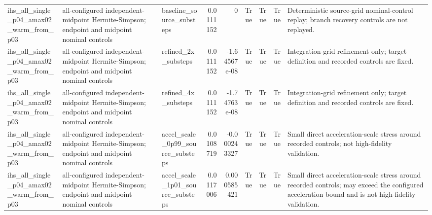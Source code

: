 \begin{tabular}{lllrrrrrl}
ihs\_all\_single\_p04\_amax02\_warm\_from\_p03 & all-configured independent-midpoint Hermite-Simpson; endpoint and midpoint nominal controls & baseline\_source\_substeps & 0.0111152 & 0 & True & True & True & Deterministic source-grid nominal-control replay; branch recovery controls are not replayed. \\
ihs\_all\_single\_p04\_amax02\_warm\_from\_p03 & all-configured independent-midpoint Hermite-Simpson; endpoint and midpoint nominal controls & refined\_2x\_substeps & 0.0111152 & -1.64567e-08 & True & True & True & Integration-grid refinement only; target definition and recorded controls are fixed. \\
ihs\_all\_single\_p04\_amax02\_warm\_from\_p03 & all-configured independent-midpoint Hermite-Simpson; endpoint and midpoint nominal controls & refined\_4x\_substeps & 0.0111152 & -1.74763e-08 & True & True & True & Integration-grid refinement only; target definition and recorded controls are fixed. \\
ihs\_all\_single\_p04\_amax02\_warm\_from\_p03 & all-configured independent-midpoint Hermite-Simpson; endpoint and midpoint nominal controls & accel\_scale\_0p99\_source\_substeps & 0.0108719 & -0.000243327 & True & True & True & Small direct acceleration-scale stress around recorded controls; not high-fidelity validation. \\
ihs\_all\_single\_p04\_amax02\_warm\_from\_p03 & all-configured independent-midpoint Hermite-Simpson; endpoint and midpoint nominal controls & accel\_scale\_1p01\_source\_substeps & 0.0117006 & 0.000585421 & True & True & True & Small direct acceleration-scale stress around recorded controls; may exceed the configured acceleration bound and is not high-fidelity validation. \\
\bottomrule
\end{tabular}
